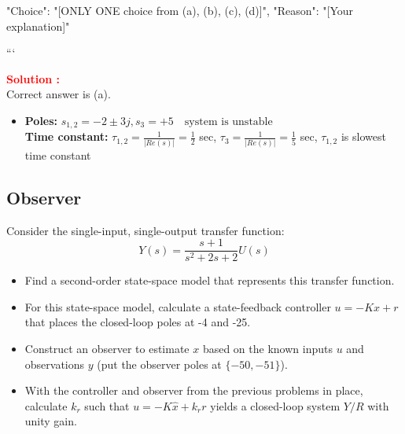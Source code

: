 \documentclass[12pt]{article}
\begin{document}
{
"Choice": "[ONLY ONE choice from (a), (b), (c), (d)]",
"Reason": "[Your explanation]"
}

```



\textbf{\textcolor{red}{Solution :}} \\
Correct answer is (a).\\
\begin{itemize}
 \item   \textbf{Poles:} \(s_{1,2} = -2 \pm 3j, s_3 = +5 \quad \text{system is unstable}\)\\
    \textbf{Time constant:} \(\tau_{1,2} = \frac{1}{|Re(s)|} = \frac{1}{2}\) sec, \(\tau_3 = \frac{1}{|Re(s)|} = \frac{1}{5}\) sec, \(\tau_{1,2}\) is slowest time constant
\end{itemize}
\clearpage

\subsection{Observer}

Consider the single-input, single-output transfer function:
$$
Y(s)=\frac{s+1}{s^2+2 s+2} U(s)
$$
\begin{itemize}
    \item [(a)] Find a second-order state-space model that represents this transfer function.
    \item [(b)] For this state-space model, calculate a state-feedback controller $u=-K x+r$ that places the closed-loop poles at -4 and -25.
    \item [(c)] Construct an observer to estimate $x$ based on the known inputs $u$ and observations $y$ (put the observer poles at $\{-50,-51\}$).
    \item [(d)] With the controller and observer from the previous problems in place, calculate $k_r$ such that $u=-K \hat{x}+k_r r$ yields a closed-loop system $Y / R$ with unity gain.
\end{itemize}
\end{document}

